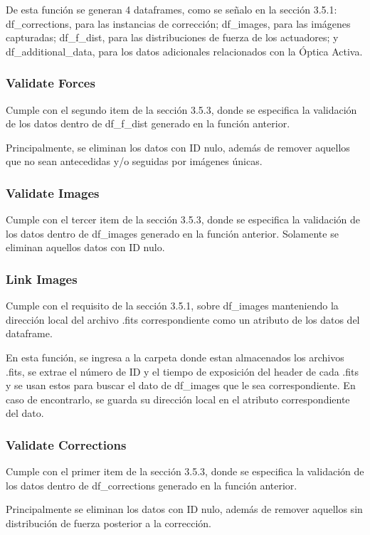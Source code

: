 De esta función se generan 4 dataframes, como se señalo en la sección 3.5.1: df\_corrections, para las instancias de corrección; df\_images, para las imágenes capturadas; df\_f\_dist, para las distribuciones de fuerza de los actuadores; y df\_additional\_data, para los datos adicionales relacionados con la Óptica Activa.

\subsubsection{Validate Forces} 
Cumple con el segundo item de la sección 3.5.3, donde se especifica la validación de los datos dentro de df\_f\_dist generado en la función anterior. 

Principalmente, se eliminan los datos con ID nulo, además de remover aquellos que no sean antecedidas y/o seguidas por imágenes únicas.

\subsubsection{Validate Images} 
Cumple con el tercer item de la sección 3.5.3, donde se especifica la validación de los datos dentro de df\_images generado en la función anterior. Solamente se eliminan aquellos datos con ID nulo.

\subsubsection{Link Images} 
Cumple con el requisito de la sección 3.5.1, sobre df\_images manteniendo la dirección local del archivo .fits correspondiente como un atributo de los datos del dataframe.

En esta función, se ingresa a la carpeta donde estan almacenados los archivos .fits, se extrae el número de ID y el tiempo de exposición del header de cada .fits y se usan estos para buscar el dato de df\_images que le sea correspondiente. En caso de encontrarlo, se guarda su dirección local en el atributo correspondiente del dato.

\subsubsection{Validate Corrections} 
Cumple con el primer item de la sección 3.5.3, donde se especifica la validación de los datos dentro de df\_corrections generado en la función anterior.

Principalmente se eliminan los datos con ID nulo, además de remover aquellos sin distribución de fuerza posterior a la corrección.

